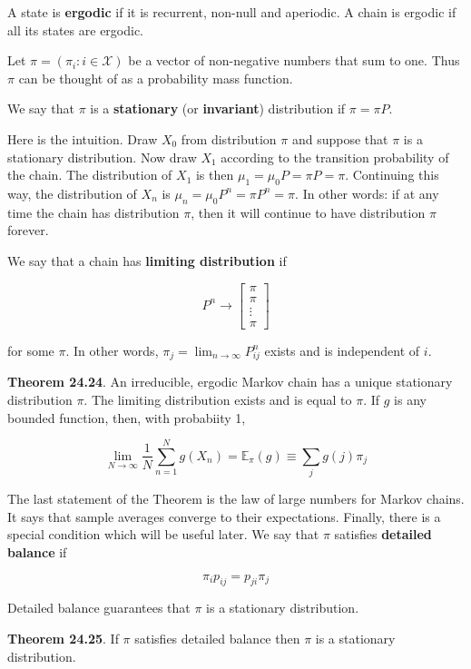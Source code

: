 A state is \textbf{ergodic} if it is recurrent, non-null and aperiodic.
A chain is ergodic if all its states are ergodic.

Let \(\pi = (\pi_{i} : i \in \mathcal{X})\) be a vector of non-negative
numbers that sum to one. Thus \(\pi\) can be thought of as a probability
mass function.

We say that \(\pi\) is a \textbf{stationary} (or \textbf{invariant})
distribution if \(\pi = \pi P\).

Here is the intuition. Draw \(X_{0}\) from distribution \(\pi\) and
suppose that \(\pi\) is a stationary distribution. Now draw \(X_{1}\)
according to the transition probability of the chain. The distribution
of \(X_{1}\) is then \(\mu_{1} = \mu_{0} P = \pi P = \pi\). Continuing this
way, the distribution of \(X_{n}\) is
\(\mu_{n} = \mu_{0} P^{n} = \pi P^{n} = \pi\). In other words: if at any time
the chain has distribution \(\pi\), then it will continue to have
distribution \(\pi\) forever.

We say that a chain has \textbf{limiting distribution} if

\[ P^{n} \rightarrow \begin{bmatrix}
\pi \\ \pi \\ \vdots \\ \pi
\end{bmatrix}\]

for some \(\pi\). In other words,
\(\pi_{j} = \lim_{n \rightarrow \infty} P_{ij}^{n}\) exists and is
independent of \(i\).

\textbf{Theorem 24.24}. An irreducible, ergodic Markov chain has a
unique stationary distribution \(\pi\). The limiting distribution exists
and is equal to \(\pi\). If \(g\) is any bounded function, then, with
probabiity 1,

\[ \lim_{N \rightarrow \infty} \frac{1}{N} \sum_{n=1}^N g(X_{n}) = \mathbb{E}_\pi(g) \equiv \sum_{j} g(j) \pi_{j} \]

The last statement of the Theorem is the law of large numbers for Markov
chains. It says that sample averages converge to their expectations.
Finally, there is a special condition which will be useful later. We say
that \(\pi\) satisfies \textbf{detailed balance} if

\[ \pi_{i} p_{ij} = p_{ji} \pi_{j} \]

Detailed balance guarantees that \(\pi\) is a stationary distribution.

\textbf{Theorem 24.25}. If \(\pi\) satisfies detailed balance then
\(\pi\) is a stationary distribution.

